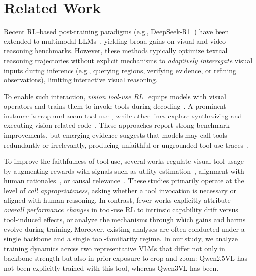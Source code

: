%
\section{Related Work}
%
Recent RL--based post-training paradigms (e.g., DeepSeek-R1~\cite{guo2025deepseek}) have been extended to multimodal LLMs~\cite{liEditThinkerIterativeReasoning2025,wangFixingReasoningPathFailures2025,yuanMMEReasoningBenchmark2025,wangVideoRFTVideoReasoning2025}, yielding broad gains on visual and video reasoning benchmarks.
However, these methods typically optimize textual reasoning trajectories without explicit mechanisms to \emph{adaptively interrogate} visual inputs during inference (e.g., querying regions, verifying evidence, or refining observations), limiting interactive visual reasoning.

To enable such interaction, \emph{vision tool-use RL}~\cite{openaiThinkingWithImages2025} equips models with visual operators and trains them to invoke tools during decoding~\cite{openaiThinkingWithImages2025,zhangSkyworkR1V4AgenticMultimodal2025,zhouReinforcedVisualPerception2025}.
A prominent instance is crop-and-zoom tool use~\cite{suPixelReasonerPixelSpace2025,zhengDeepEyesIncentivizingThinking2025,laiMinio3ScalingUp2025,liuHiDeRethinkingZoomIN2025}, while other lines explore synthesizing and executing vision-related code~\cite{zhangThymeThinkBeyond2025,zhao2025pyvisionagenticvisiondynamic}.
These approaches report strong benchmark improvements, but emerging evidence suggests that models may call tools redundantly or irrelevantly, producing unfaithful or ungrounded tool-use traces~\cite{yuVFaithLargeMultimodal2025,liuFaithfulnessVisualThinking2025,duRevisitingNecessityLengthy2025}.

To improve the faithfulness of tool-use, several works regulate visual tool usage by augmenting rewards with signals such as utility estimation~\cite{wangAdaToolerVAdaptiveToolUse2025}, alignment with human rationales~\cite{wangIllusionIntentionVisual2025}, or causal relevance~\cite{liuFaithfulnessVisualThinking2025}.
These studies primarily operate at the level of \emph{call appropriateness}, asking whether a tool invocation is necessary or aligned with human reasoning.
In contrast, fewer works explicitly attribute \emph{overall performance changes} in tool-use RL to intrinsic capability drift versus tool-induced effects, or analyze the mechanisms through which gains and harms evolve during training.
Moreover, existing analyses are often conducted under a single backbone and a single tool-familiarity regime.
In our study, we analyze training dynamics across two representative VLMs that differ not only in backbone strength but also in prior exposure to crop-and-zoom: Qwen2.5VL has not been explicitly trained with this tool, whereas Qwen3VL has been.


